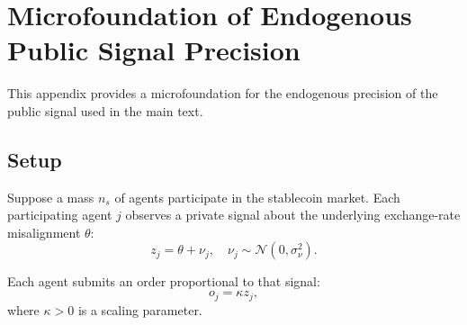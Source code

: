 \appendix

\section{Microfoundation of Endogenous Public Signal Precision}

This appendix provides a microfoundation for the endogenous precision of the public signal used in the main text.

\subsection{Setup}

Suppose a mass $n_s$ of agents participate in the stablecoin market. Each participating agent $j$ observes a private signal about the underlying exchange-rate misalignment $\theta$:
\begin{equation}
z_j = \theta + \nu_j, \quad \nu_j \sim \mathcal{N}(0, \sigma_\nu^2).
\end{equation}

Each agent submits an order proportional to that signal:
\begin{equation}
o_j = \kappa z_j,
\end{equation}
where $\kappa > 0$ is a scaling parameter.
